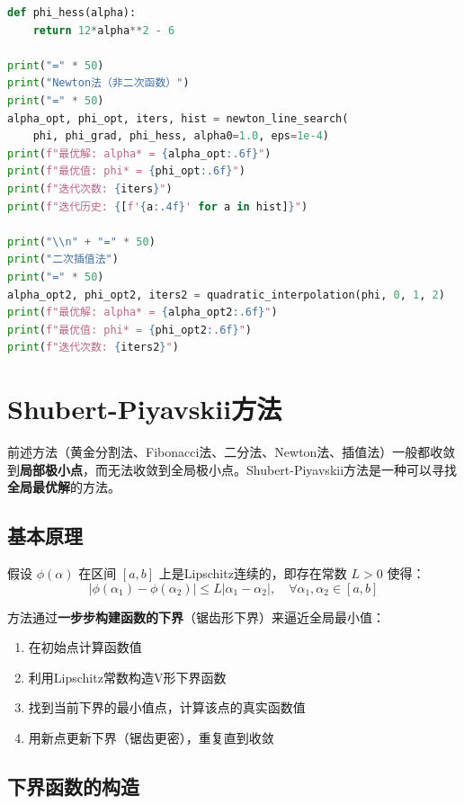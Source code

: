 \begin{lstlisting}[language=Python, caption=Newton法与插值法实现]
def phi_hess(alpha):
    return 12*alpha**2 - 6

print("=" * 50)
print("Newton法（非二次函数）")
print("=" * 50)
alpha_opt, phi_opt, iters, hist = newton_line_search(
    phi, phi_grad, phi_hess, alpha0=1.0, eps=1e-4)
print(f"最优解: alpha* = {alpha_opt:.6f}")
print(f"最优值: phi* = {phi_opt:.6f}")
print(f"迭代次数: {iters}")
print(f"迭代历史: {[f'{a:.4f}' for a in hist]}")

print("\\n" + "=" * 50)
print("二次插值法")
print("=" * 50)
alpha_opt2, phi_opt2, iters2 = quadratic_interpolation(phi, 0, 1, 2)
print(f"最优解: alpha* = {alpha_opt2:.6f}")
print(f"最优值: phi* = {phi_opt2:.6f}")
print(f"迭代次数: {iters2}")
\end{lstlisting}

\section{Shubert-Piyavskii方法}\label{sec:shubert}

前述方法（黄金分割法、Fibonacci法、二分法、Newton法、插值法）一般都收敛到\textbf{局部极小点}，而无法收敛到全局极小点。Shubert-Piyavskii方法是一种可以寻找\textbf{全局最优解}的方法。

\subsection{基本原理}

\begin{conceptbox}
假设 $\phi(\alpha)$ 在区间 $[a, b]$ 上是Lipschitz连续的，即存在常数 $L > 0$ 使得：
\[
|\phi(\alpha_1) - \phi(\alpha_2)| \leq L |\alpha_1 - \alpha_2|,\quad \forall \alpha_1, \alpha_2 \in [a, b]
\]

方法通过\textbf{一步步构建函数的下界}（锯齿形下界）来逼近全局最小值：
\begin{enumerate}[label=\arabic*., leftmargin=2em]
    \item 在初始点计算函数值
    \item 利用Lipschitz常数构造V形下界函数
    \item 找到当前下界的最小值点，计算该点的真实函数值
    \item 用新点更新下界（锯齿更密），重复直到收敛
\end{enumerate}
\end{conceptbox}

\subsection{下界函数的构造}

